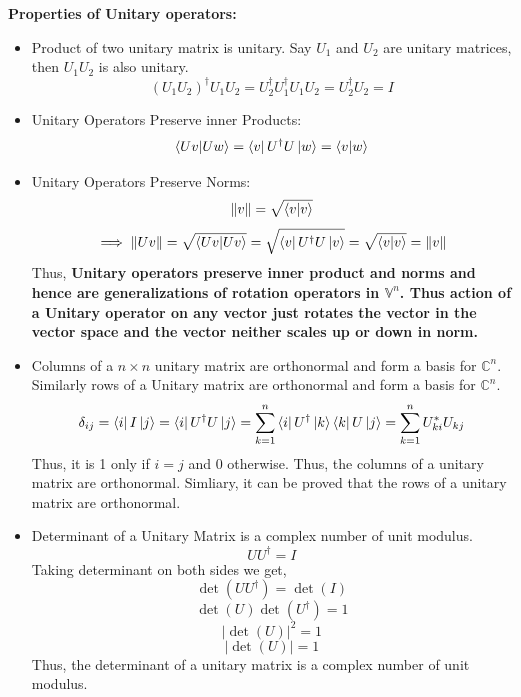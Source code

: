 \textbf{Properties of Unitary operators: }
\begin{itemize}
    \item Product of two unitary matrix is unitary.
    Say $U_1$ and $U_2$ are unitary matrices, then $U_1U_2$ is also unitary.
    \[(U_1U_2)^{\dagger}U_1U_2=U_2^{\dagger}U_1^{\dagger}U_1U_2=U_2^{\dagger}U_2=I\]
    \item Unitary Operators Preserve inner Products:
    \[ \braket{Uv|Uw}=\bra{v}U^{\dagger}U\ket{w}=\braket{v|w} \]
    \item Unitary Operators Preserve Norms:
    \[ \|v\|=\sqrt{\braket{v|v}} \]
    \[ \implies \|Uv\|=\sqrt{\braket{Uv|Uv}}=\sqrt{\bra{v}U^{\dagger}U\ket{v}}=\sqrt{\braket{v|v}}=\|v\| \]
    Thus, \textbf{Unitary operators preserve inner product and norms and hence are generalizations of rotation operators in $\mathbb{V}^n$.
    Thus action of a Unitary operator on any vector just rotates the vector in the vector space and the vector neither scales up or down in norm.}
    \item Columns of a $n \times n$ unitary matrix are orthonormal and form a basis for $\mathbb{C}^n$.
    Similarly rows of a Unitary matrix are orthonormal and form a basis for $\mathbb{C}^n$.
    \[\delta_{ij}=\bra{i}I\ket{j}=\bra{i}U^{\dagger}U\ket{j}=\sum_{k=1}^n \bra{i}U^{\dagger}\ket{k}\bra{k}U\ket{j}=\sum_{k=1}^nU_{ki}^*U_{kj}\]
    Thus, it is 1 only if $i=j$ and 0 otherwise. Thus, the columns of a unitary matrix are orthonormal. Simliary, it can be 
    proved that the rows of a unitary matrix are orthonormal.
    \item Determinant of a Unitary Matrix is a complex number of unit modulus.
    \[ UU^{\dagger}=I\]
    Taking determinant on both sides we get,
    \[ \det(UU^{\dagger})=\det(I) \]
    \[ \det(U)\det(U^{\dagger})=1 \]
    \[ |\det(U)|^2=1\]
    \[ |\det(U)| = 1 \]
    Thus, the determinant of a unitary matrix is a complex number of unit modulus.
\end{itemize}

